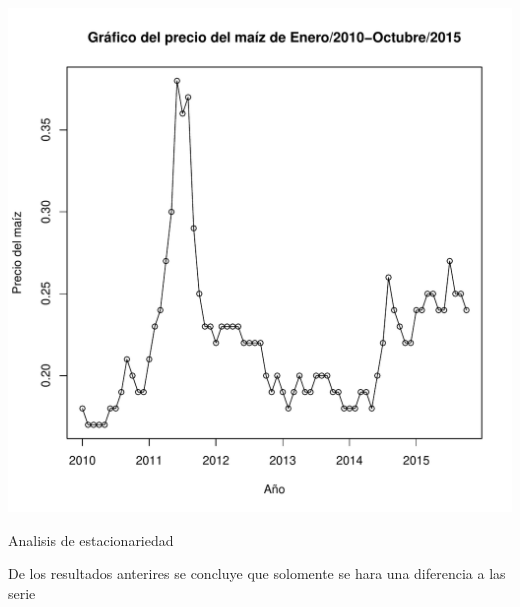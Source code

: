 \documentclass{article}\usepackage[]{graphicx}\usepackage[]{color}
\makeatletter
\def\maxwidth{ %
  \ifdim\Gin@nat@width>\linewidth
    \linewidth
  \else
    \Gin@nat@width
  \fi
}
\newenvironment{kframe}{%
 \def\at@end@of@kframe{}%
 \ifinner\ifhmode%
  \def\at@end@of@kframe{\end{minipage}}%
  \begin{minipage}{\columnwidth}%
 \fi\fi%
 \def\FrameCommand##1{\hskip\@totalleftmargin \hskip-\fboxsep
 \colorbox{shadecolor}{##1}\hskip-\fboxsep
     \hskip-\linewidth \hskip-\@totalleftmargin \hskip\columnwidth}%
 \MakeFramed {\advance\hsize-\width
   \@totalleftmargin\z@ \linewidth\hsize
   \@setminipage}}%
 {\par\unskip\endMakeFramed%
 \at@end@of@kframe}
\newenvironment{knitrout}{}{} %
\makeatother
\begin{document}
\begin{knitrout}
\begin{kframe}
\end{kframe}
\includegraphics[width=\maxwidth]{figure/unnamed-chunk-1-1} 

\end{knitrout}

Analisis de estacionariedad


De los resultados anterires se concluye que solomente se hara una diferencia a las serie
\end{document}
